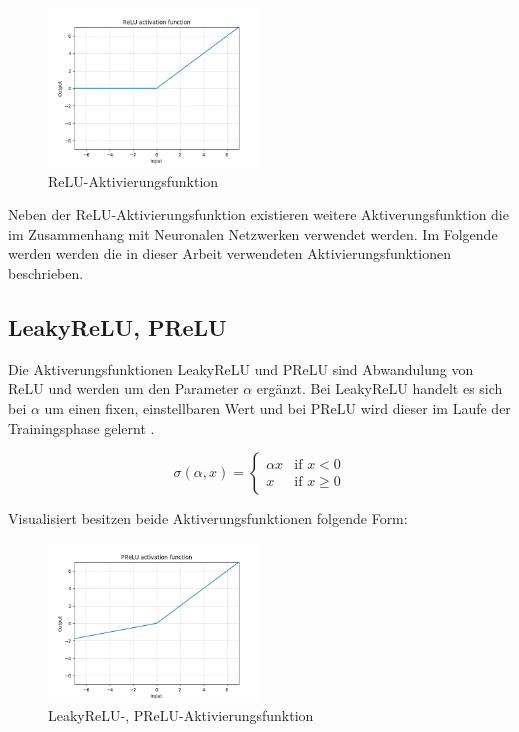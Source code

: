 \begin{figure}[H]
	\centering
	\includegraphics[width=0.50\textwidth]{resources/content/ReLU.png}
	\caption{ReLU-Aktivierungsfunktion \cite{relu_activation_function_img}}
	\label{img:relu_activation_function}
\end{figure}


Neben der ReLU-Aktivierungsfunktion existieren weitere Aktiverungsfunktion die im Zusammenhang mit Neuronalen Netzwerken verwendet werden.
Im Folgende werden werden die in dieser Arbeit verwendeten Aktivierungsfunktionen beschrieben.

\subsection{LeakyReLU, PReLU}

Die Aktiverungsfunktionen LeakyReLU und PReLU sind Abwandulung von ReLU und werden um den Parameter $ \alpha $ ergänzt. Bei LeakyReLU handelt es sich bei $ \alpha $ um einen fixen, einstellbaren Wert und bei PReLU wird dieser im Laufe der Trainingsphase gelernt \cite{DBLP:journals/corr/XuWCL15}.

\begin{equation}
	\sigma(\alpha ,x) = {
		\begin{cases}
			\alpha x & {\text{if }} x < 0 \\
			x        & {\text{if }} x \geq 0
		\end{cases}
	}
\end{equation}

Visualisiert besitzen beide Aktiverungsfunktionen folgende Form:


\begin{figure}[H]
	\centering
	\includegraphics[width=0.50\textwidth]{resources/content/PReLU.png}
	\caption{LeakyReLU-, PReLU-Aktivierungsfunktion \cite{prelu_activation_function_img}}
	\label{img:prelu_activation_function}
\end{figure}

